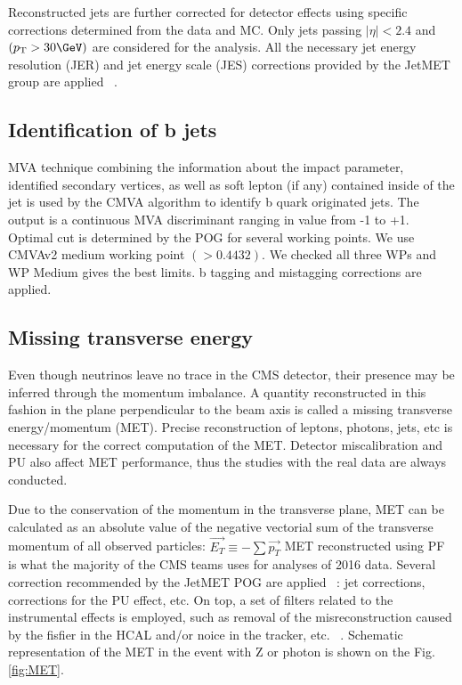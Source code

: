     Reconstructed jets are further corrected for detector effects using specific corrections determined from the data and MC. Only jets passing $|\eta|<2.4$ and  $(\pt > 30\GeV)$ are considered for the analysis. 
    All the necessary jet energy resolution (JER) and jet energy scale (JES) corrections provided by the JetMET group are applied ~\cite{JetMETgroup}.


\subsection{Identification of b jets\label{sec:bjets}}
MVA technique combining the information about the impact parameter, identified secondary vertices, as well as soft lepton (if any) contained inside of the jet is used by the CMVA algorithm to identify b quark originated jets. The output is a continuous MVA discriminant ranging in value from -1 to +1. Optimal cut is determined by the POG for several working points. We use CMVAv2 medium working point  $(>0.4432)$. We checked all three WPs and WP Medium gives the best limits. b tagging and mistagging corrections are applied.



\subsection{Missing transverse energy}\label{sec:MET}
Even though neutrinos leave no trace in the CMS detector, their presence may be inferred through the momentum imbalance. A quantity reconstructed in this fashion in the plane perpendicular to the beam axis is called a missing transverse energy/momentum (MET). Precise reconstruction of leptons, photons, jets, etc is necessary for the correct computation of the MET. Detector miscalibration and PU also affect MET performance, thus the studies with the real data are always conducted.   

Due to the conservation of the momentum in the transverse plane, MET can be calculated as an absolute value of the negative vectorial sum of the transverse momentum of all observed particles:  
$\overrightarrow{E_T} \equiv -\sum \overrightarrow{p_T}$
MET reconstructed using PF is what the majority of the CMS teams uses for analyses of 2016 data.  
Several correction recommended by the JetMET POG are applied ~\cite{MissingETRun2Corrections}: jet corrections, corrections for the PU effect, etc. On top, a set of filters related to the instrumental effects is employed, such as removal of the misreconstruction caused by the fisfier in the HCAL and/or noice in the tracker, etc.  ~\cite{MissingETOptionalFiltersRun2}. Schematic representation of the MET in the event with Z or photon is shown on the Fig. \ref{fig:MET}.

